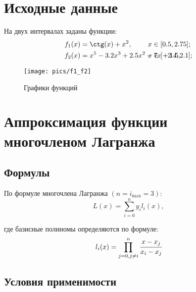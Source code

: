 






\setcounter{page}{2}


\section*{Исходные данные}

На двух интервалах заданы функции:
\begin{align}
    \label{f1}
    f_1(x) &= \ctg(x) + x^2, &\hspace{-2cm}  x &\in [0.5, 2.75]; \\
    \label{f2}
    f_2(x) &= x^5 - 3.2x^3 + 2.5x^2 - 7x + 1.5, &\hspace{-2cm} x &\in [-2.4, 2.1];
\end{align}

\begin{figure}[h] \centering
    \caption{Графики функций}
    \texttt{[image: pics/f1\_f2]}
    \label{pic:f1_f2}
\end{figure}

\clearpage

\section{Аппроксимация функции многочленом Лагранжа}

\subsection{Формулы}

По формуле многочлена Лагранжа $(n=i_{\max} = 3)$:
\begin{equation}
    L(x)=\sum_{i=0}^{n}y_il_i(x),
\end{equation}

где базисные полиномы определяются по формуле:
\begin{equation}
    \label{l_i}
    l_i(x)=\prod_{j=0,j\ne i}^{n}\cfrac{x-x_j}{x_i-x_j}
\end{equation}

\subsection{Условия применимости}


